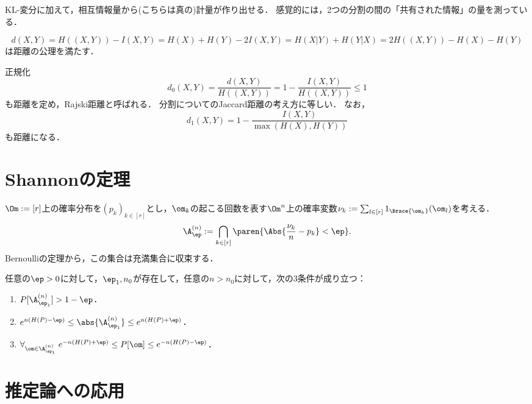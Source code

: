 \documentclass[uplatex,dvipdfmx]{jsreport}
\begin{document}
\begin{tcolorbox}[colframe=ForestGreen, colback=ForestGreen!10!white,breakable,colbacktitle=ForestGreen!40!white,coltitle=black,fonttitle=\bfseries\sffamily,
title=]
    KL-変分に加えて，相互情報量から(こちらは真の)計量が作り出せる．
    感覚的には，2つの分割の間の「共有された情報」の量を測っている．
\end{tcolorbox}

\begin{proposition}
    \[d(X,Y)=H((X,Y))-I(X,Y)=H(X)+H(Y)-2I(X,Y)=H(X|Y)+H(Y|X)=2H((X,Y))-H(X)-H(Y)\]
    は距離の公理を満たす．
\end{proposition}
\begin{remarks}
    正規化
    \[d_0(X,Y)=\frac{d(X,Y)}{H((X,Y))}=1-\frac{I(X,Y)}{H((X,Y))}\le1\]
    も距離を定め，Rajski距離と呼ばれる．
    分割についてのJaccard距離の考え方に等しい．
    なお，
    \[d_1(X,Y)=1-\frac{I(X,Y)}{\max(H(X),H(Y))}\]
    も距離になる．
\end{remarks}

\section{Shannonの定理}

\begin{notation}
    $\Om:=[r]$上の確率分布を$(p_k)_{k\in[r]}$とし，$\om_k$の起こる回数を表す$\Om^n$上の確率変数$\nu_k:=\sum_{l\in[r]}1_{\Brace{\om_k}}(\om_l)$を考える．
    \[\A_\ep^{(n)}:=\bigcap_{k\in[r]}\paren{\Abs{\frac{\nu_k}{n}-p_k}<\ep}.\]
    Bernoulliの定理から，この集合は充満集合に収束する．
\end{notation}

\begin{theorem}[Shannon (1948)]
    任意の$\ep>0$に対して，$\ep_1,n_0$が存在して，任意の$n>n_0$に対して，次の3条件が成り立つ：
    \begin{enumerate}
        \item $P[\A_{\ep_1}^{(n)}]>1-\ep$．
        \item $e^{n(H(P)-\ep)}\le\abs{\A_{\ep_1}^{(n)}}\le e^{n(H(P)+\ep)}$．
        \item $\forall_{\om\in\A_{\ep_1}^{(n)}}\;e^{-n(H(P)+\ep)}\le P[\om]\le e^{-n(H(P)-\ep)}$．
    \end{enumerate}
\end{theorem}

\section{推定論への応用}
\end{document}
